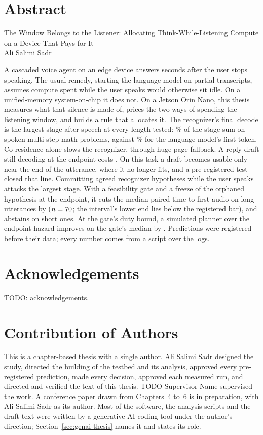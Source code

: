 \documentclass[12pt,letterpaper,oneside]{report}
\newcommand{\thesistitle}{The Window Belongs to the Listener: Allocating
Think-While-Listening Compute on a Device That Pays for It}
\newcommand{\supervisorname}{TODO Supervisor Name}               %
\begin{document}
\setcounter{page}{3}

\chapter*{Abstract}
\begin{center}
\thesistitle\\[1ex]
Ali Salimi Sadr
\end{center}
A cascaded voice agent on an edge device answers seconds after the user
stops speaking. The usual remedy, starting the language model on partial
transcripts, assumes compute spent while the user speaks would
otherwise sit idle. On a unified-memory system-on-chip it does not. On a
Jetson Orin Nano, this thesis measures what that silence is made of, prices
the two ways of spending the listening window, and builds a rule that
allocates it. The recognizer's final decode is the largest stage after speech
at every length tested: \SttShareMulti\% of the stage sum on spoken
multi-step math problems, against \LlmShareMulti\% for the language model's
first token. Co-residence alone slows the recognizer, through huge-page
fallback. A reply draft still decoding at the endpoint costs
\ThinkerOverlap. On this task a draft becomes usable only near the end of the
utterance, where it no longer fits, and a pre-registered test closed that
line. Committing agreed recognizer hypotheses while the user speaks attacks
the largest stage. With a feasibility gate and a freeze of the
orphaned hypothesis at the endpoint, it cuts the median paired time to first
audio on long utterances by \PthreeRed{} ($n=70$; the interval's lower
end lies below the registered bar), and abstains on short ones. At the gate's duty bound,
a simulated planner over the endpoint hazard improves on the gate's median by
\PlannerDP. Predictions were registered before their data; every number comes
from a script over the logs.

\chapter*{Acknowledgements}
TODO: acknowledgements.

\chapter*{Contribution of Authors}
This is a chapter-based thesis with a single author. Ali Salimi Sadr
designed the study, directed the building of the testbed and its analysis,
approved every pre-registered prediction, made every decision, approved each
measured run, and directed and verified the text of this thesis.
\supervisorname{} supervised the work. A conference paper drawn from
Chapters~4 to~6 is in preparation, with Ali Salimi Sadr as its author.
Most of the software, the analysis scripts and the draft text were written by
a generative-AI coding tool under the author's direction; Section~\ref{sec:genai-thesis}
names it and states its role.
\end{document}
